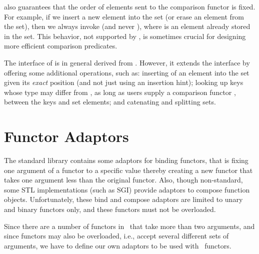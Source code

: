  also guarantees that the order of
elements sent to the comparison functor is fixed. For example, if we insert
a new element  into the set (or erase an element from the set), then
we always invoke  (and never ),
where  is an element already stored in the set. This behavior, not
supported by , is sometimes crucial for designing more
efficient comparison predicates.


The interface of  is in general
derived from . However, it extends the interface by
offering some additional operations, such as: inserting of an element into
the set given its {\em exact} position (and not just using an insertion hint);
looking up keys whose type may differ from , as long as users supply
a comparison functor , between the keys and set elements;
and catenating and splitting sets.

\section*{Functor Adaptors}

The standard library contains some adaptors for binding functors, that
is fixing one argument of a functor to a specific value thereby
creating a new functor that takes one argument less than the original
functor.  Also, though non-standard, some STL implementations (such as
SGI) provide adaptors to compose function objects. Unfortunately,
these bind and compose adaptors are limited to unary and binary
functors only, and these functors must not be overloaded.

Since there are a number of functors in \cgal\ that take more than two
arguments, and since functors may also be overloaded, i.e., accept
several different sets of arguments, we have to define our own
adaptors to be used with \cgal\ functors.